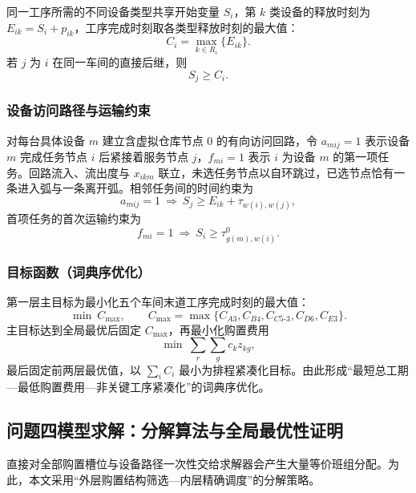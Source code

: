 \documentclass[12pt,a4paper]{article}
\begin{document}
同一工序所需的不同设备类型共享开始变量 $S_i$，第 $k$ 类设备的释放时刻为 $E_{ik}=S_i+p_{ik}$，工序完成时刻取各类型释放时刻的最大值：
\begin{equation}
C_i=\max_{k\in R_i}\{E_{ik}\}.
\end{equation}
若 $j$ 为 $i$ 在同一车间的直接后继，则
\begin{equation}
S_j\ge C_i .
\end{equation}

\subsubsection{设备访问路径与运输约束}

对每台具体设备 $m$ 建立含虚拟仓库节点 0 的有向访问回路，令 $a_{mij}=1$ 表示设备 $m$ 完成任务节点 $i$ 后紧接着服务节点 $j$，$f_{mi}=1$ 表示 $i$ 为设备 $m$ 的第一项任务。回路流入、流出度与 $x_{ikm}$ 联立，未选任务节点以自环跳过，已选节点恰有一条进入弧与一条离开弧。相邻任务间的时间约束为
\begin{equation}
a_{mij}=1\ \Rightarrow\ S_j\ge E_{ik}+\tau_{w(i),w(j)},
\end{equation}
首项任务的首次运输约束为
\begin{equation}
f_{mi}=1\ \Rightarrow\ S_i\ge \tau^{0}_{g(m),w(i)} .
\end{equation}

\subsubsection{目标函数（词典序优化）}

第一层主目标为最小化五个车间末道工序完成时刻的最大值：
\begin{equation}
\min\ C_{\max},\qquad C_{\max}=\max\{C_{A3},C_{B4},C_{C5\text{-}3},C_{D6},C_{E3}\}.
\end{equation}
主目标达到全局最优后固定 $C_{\max}$，再最小化购置费用
\begin{equation}
\min\ \sum_{r}\sum_{g} c_k z_{kg},
\end{equation}
最后固定前两层最优值，以 $\sum_i C_i$ 最小为排程紧凑化目标。由此形成“最短总工期—最低购置费用—非关键工序紧凑化”的词典序优化。

\subsection{问题四模型求解：分解算法与全局最优性证明}

直接对全部购置槽位与设备路径一次性交给求解器会产生大量等价班组分配。为此，本文采用“外层购置结构筛选—内层精确调度”的分解策略。
\end{document}
